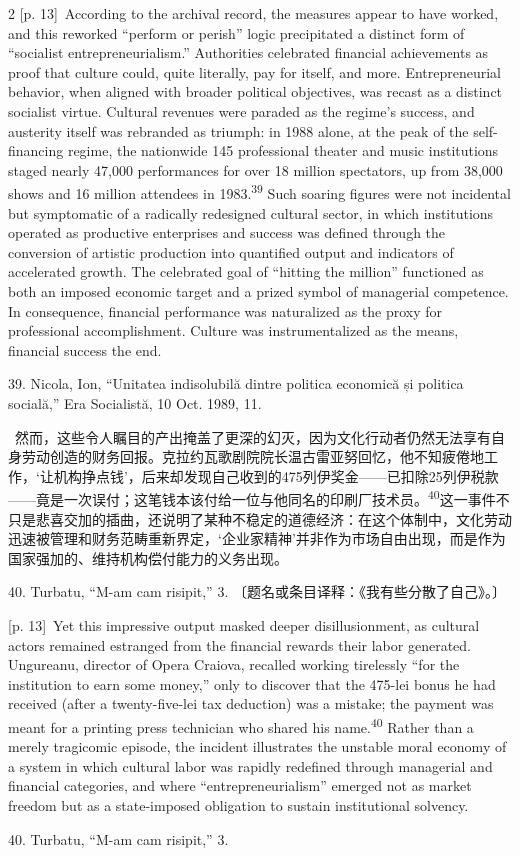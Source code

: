 \documentclass[10pt,a4paper]{article}
\begin{document}
\begin{paracol}{2}
{\scriptsize\color{gray} [p. 13]}\ According to the archival record, the measures appear to have worked, and this reworked “perform or perish” logic precipitated a distinct form of “socialist entrepreneurialism.” Authorities celebrated financial achievements as proof that culture could, quite literally, pay for itself, and more. Entrepreneurial behavior, when aligned with broader political objectives, was recast as a distinct socialist virtue. Cultural revenues were paraded as the regime’s success, and austerity itself was rebranded as triumph: in 1988 alone, at the peak of the self-financing regime, the nationwide 145 professional theater and music institutions staged nearly 47,000 performances for over 18 million spectators, up from 38,000 shows and 16 million attendees in 1983.\nobreak\textsuperscript{39} Such soaring figures were not incidental but symptomatic of a radically redesigned cultural sector, in which institutions operated as productive enterprises and success was defined through the conversion of artistic production into quantified output and indicators of accelerated growth. The celebrated goal of “hitting the million” functioned as both an imposed economic target and a prized symbol of managerial competence. In consequence, financial performance was naturalized as the proxy for professional accomplishment. Culture was instrumentalized as the means, financial success the end.\par{\small 39. Nicola, Ion, “Unitatea indisolubilă dintre politica economică și politica socială,” Era Socialistă, 10 Oct. 1989, 11.\par}
\switchcolumn*
{\scriptsize\color{gray} [p. 13]}\ 然而，这些令人瞩目的产出掩盖了更深的幻灭，因为文化行动者仍然无法享有自身劳动创造的财务回报。克拉约瓦歌剧院院长温古雷亚努回忆，他不知疲倦地工作，‘让机构挣点钱’，后来却发现自己收到的475列伊奖金——已扣除25列伊税款——竟是一次误付；这笔钱本该付给一位与他同名的印刷厂技术\mbox{员。\textsuperscript{40}}这一事件不只是悲喜交加的插曲，还说明了某种不稳定的道德经济：在这个体制中，文化劳动迅速被管理和财务范畴重新界定，‘企业家精神’并非作为市场自由出现，而是作为国家强加的、维持机构偿付能力的义务出现。\par{\small 40. Turbatu, “M-am cam risipit,” 3. 〔题名或条目译释：《我有些分散了自己》。〕\par}
\switchcolumn
{\scriptsize\color{gray} [p. 13]}\ Yet this impressive output masked deeper disillusionment, as cultural actors remained estranged from the financial rewards their labor generated. Ungureanu, director of Opera Craiova, recalled working tirelessly “for the institution to earn some money,” only to discover that the 475-lei bonus he had received (after a twenty-five-lei tax deduction) was a mistake; the payment was meant for a printing press technician who shared his name.\nobreak\textsuperscript{40} Rather than a merely tragicomic episode, the incident illustrates the unstable moral economy of a system in which cultural labor was rapidly redefined through managerial and financial categories, and where “entrepreneurialism” emerged not as market freedom but as a state-imposed obligation to sustain institutional solvency.\par{\small 40. Turbatu, “M-am cam risipit,” 3.\par}

\end{paracol}
\end{document}
